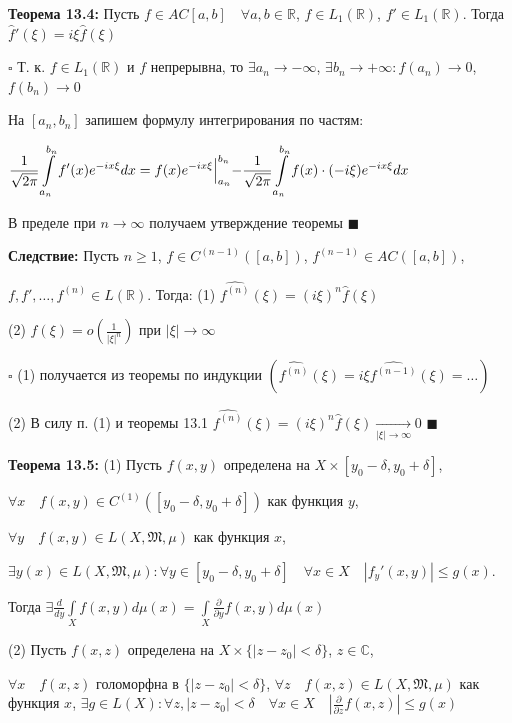 \documentclass[a4paper]{report}
\begin{document}
\noindent\textbf{Теорема 13.4:} Пусть $f\in AC[a,b]\quad\forall a,b\in\mathbb R$, $f\in L_1(\mathbb R)$, $f'\in L_1(\mathbb R)$. Тогда $\hat f'(\xi)=i\xi\hat f(\xi)$

\noindent $\square$ Т. к. $f\in L_1(\mathbb R)$ и $f$ непрерывна, то $\exists a_n\to-\infty$, $\exists b_n\to+\infty\colon f(a_n)\to0$, $f(b_n)\to0$

На $[a_n,b_n]$ запишем формулу интегрирования по частям:

$\displaystyle\frac{1}{\sqrt{2\pi}}\displaystyle\int\limits_{a_n}^{b_n}f'(x)e^{-ix\xi}dx=f(x)e^{-ix\xi}\Bigl|_{a_n}^{b_n}-\frac{1}{\sqrt{2\pi}}\displaystyle\int\limits_{a_n}^{b_n}f(x)\cdot(-i\xi)e^{-ix\xi}dx$

В пределе при $n\to\infty$ получаем утверждение теоремы $\blacksquare$
\bigskip

\noindent\textbf{Следствие:} Пусть $n\ge1$, $f\in C^{(n-1)}([a,b])$, $f^{(n-1)}\in AC([a,b])$,

\noindent $f,f',\ldots,f^{(n)}\in L(\mathbb R)$.
Тогда: (1) $\widehat{f^{(n)}}(\xi)=(i\xi)^n\hat f(\xi)$

(2) $\hat f(\xi)=o\left(\frac{1}{|\xi|^n}\right)$ при $|\xi|\to\infty$

\noindent $\square$ (1) получается из теоремы по индукции $(\widehat{f^{(n)}}(\xi)=i\xi\widehat{f^{(n-1)}}(\xi)=\ldots)$

(2) В силу п. (1) и теоремы 13.1 $\widehat{f^{(n)}}(\xi)=(i\xi)^n\hat f(\xi)\xrightarrow[|\xi|\to\infty]{}0$ $\blacksquare$
\bigskip

\noindent\textbf{Теорема 13.5:} (1) Пусть $f(x,y)$ определена на $X\times[y_0-\delta,y_0+\delta]$,

 $\forall x\quad f(x,y)\in C^{(1)}([y_0-\delta,y_0+\delta])$ как функция $y$,

 $\forall y\quad f(x,y)\in L(X,\mathfrak M,\mu)$ как функция $x$,

 $\exists y(x)\in L(X,\mathfrak M,\mu)\colon\forall y\in[y_0-\delta,y_0+\delta]\quad\forall x\in X\quad |f_y'(x,y)|\le g(x)$.

Тогда $\exists\displaystyle\frac{d}{dy}\displaystyle\int\limits_X f(x,y)d\mu(x)=\displaystyle\int\limits_X\frac{\partial}{\partial y}f(x,y)d\mu(x)$

(2) Пусть $f(x,z)$ определена на $X\times\{|z-z_0|<\delta\}$, $z\in\mathbb C$,

$\forall x\quad f(x,z)$ голоморфна в $\{|z-z_0|<\delta\}$, $\forall z\quad f(x,z)\in L(X,\mathfrak M,\mu)$ как функция $x$, $\exists g\in L(X)\colon\forall z,|z-z_0|<\delta\quad\forall x\in X\quad\left|\displaystyle\frac{\partial}{\partial z}f(x,z)\right|\le g(x)$
\end{document}
